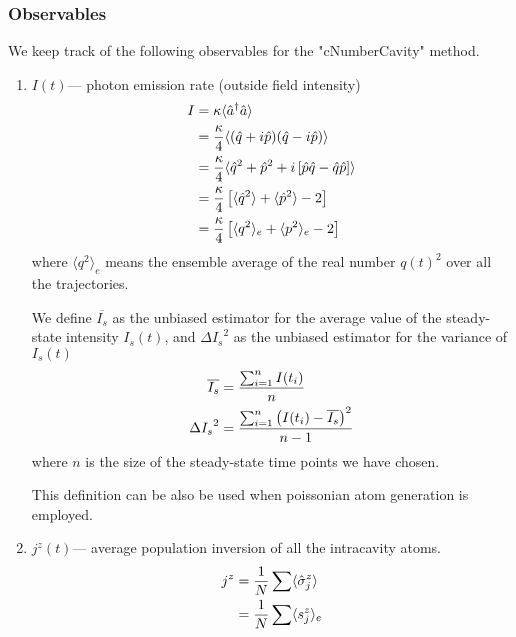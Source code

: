 \documentclass{article}
\begin{document}
\subsubsection{Observables}
We keep track of the following observables for the "cNumberCavity" method. 
\begin{enumerate}
    \item  $I(t)$\---- photon emission rate (outside field intensity)
        \begin{align}
            \notag I &= \kappa \langle \hat{a}^\dagger \hat{a} \rangle\\
            \notag   &= \frac{\kappa}{4} \langle ( \hat{q}+i\hat{p})(\hat{q}-i\hat{p}) \rangle\\
            \notag   &= \frac{\kappa}{4} \langle \hat{q}^2+\hat{p}^2+i\left[\hat{p}\hat{q}-\hat{q}\hat{p}\right] \rangle\\
            \notag   &= \frac{\kappa}{4}\left[\langle \hat{q}^2\rangle+\langle\hat{p}^2\rangle-2\right]\\
                     &= \frac{\kappa}{4}\left[\langle q^2 \rangle_e+\langle p^2 \rangle_e-2\right]
        \end{align}
        where $\langle q^2 \rangle_e$ means the ensemble average of the real number $q(t)^2$ over all the trajectories.
    
    We define $\overline{I_s}$ as the unbiased estimator for the average value of the steady-state intensity $I_s(t)$, and ${\Delta I_s}^2$ as the unbiased estimator for the variance of $I_s(t)$
    \begin{align}
    \label{estimator;intensity}
        \notag \overline{I_s} &= \frac{\sum_{i=1}^{n} I(t_i)}{n}\\
               {\Delta I_s}^2 &= \frac{\sum_{i=1}^{n} \left(I(t_i)-\overline{I_s}\right)^2}{n-1}
    \end{align}
    where $n$ is the size of the steady-state time points we have chosen.
    
    This definition can be also be used when poissonian atom generation is employed.
    \item $j^z(t)$\---- average population inversion of all the intracavity atoms.
        \begin{align}
            \notag j^z &= \frac{1}{N}\sum \langle \hat{\sigma}^z _j\rangle\\
                       &= \frac{1}{N}\sum \langle s_j^z\rangle_e
        \end{align}
        

\end{enumerate}
\end{document}
